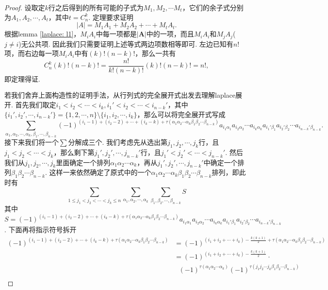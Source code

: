 \documentclass{article}
\newcommand{\mbf}[1]{\bm{#1}}
\begin{document}
\begin{proof}
设取定$k$行之后得到的所有可能的子式为$M_1,M_2,\cdots M_t$，它们的余子式分别为$A_1,A_2,\cdots,A_t$，其中$t=C_n^k$. 定理要求证明
$$
|A| = M_1A_1 + M_2A_2 + \cdots + M_tA_t.
$$
根据lemma \ref{laplace: l1}，$M_iA_i$中每一项都是$|\mbf{A}|$中的一项，而且$M_iA_i$和$M_jA_j$($j \neq i$)无公共项. {\color{blue}因此我们只需要证明上述等式两边项数相等即可}. 左边已知有$n!$项，而右边每一项$M_iA_i$中有$(k)!(n-k)!$，那么一共有
$$
C_n^k (k)!(n-k)! = \frac{n!}{k!(n-k)!}(k)!(n-k)! = n!,
$$
即定理得证.

\newpage
{\color{blue}若我们舍弃上面构造性的证明手法，从行列式的完全展开式出发去理解laplace展开}. 首先我们取定$i_1 < i_2 < \cdots < i_k, i_1' < i_2 < \cdots < i_{n-k}'$，其中$\{i_1',i_2',\cdots, i_{n-k}'\} = \{1,2,\cdots,n\}\setminus\{i_1,i_2,\cdots,i_k\}$，那么可以将完全展开式写成
$$
\sum\limits_{\alpha_1,\alpha_2,\cdots,\alpha_k,\beta_1,\cdots,\beta_{n-k}}(-1)^{(i_1-1)+(i_2-2) +\cdots + (i_k-k) + \tau(\alpha_1\alpha_2\cdots\alpha_k\beta_1\beta_2\cdots \beta_{n-k})} a_{i_1\alpha_1}a_{i_2\alpha_2}\cdots a_{i_k\alpha_k}a_{i_1'\beta_1}a_{i_2'\beta_2}\cdots a_{i_{n-k}'\beta_{n-k}}.
$$
接下来我们将一个$\sum$分解成三个. 我们考虑先从选出第$j_1,j_2,\cdots,j_k$行，且$j_1 < j_2 < \cdots < j_k$，那么剩下第$j_1',j_2',\cdots,j_{n-k}'$行，且$j_1' < j_2' < \cdots < j_{n-k}'$. 然后我们从$j_1,j_2,\cdots,j_k$里面确定一个排列$\alpha_1\alpha_2\cdots\alpha_k$，再从$j_1',j_2',\cdots,j_{n-k}'$中确定一个排列$\beta_1\beta_2\cdots \beta_{n-k}$. 这样一来依然确定了原式中的一个$\alpha_1\alpha_2\cdots\alpha_k\beta_1\beta_2\cdots\beta_{n-k}$排列，即此时有
$$
\sum\limits_{1\leq j_1 < j_2 < \cdots < j_k \leq n} \sum\limits_{\alpha_1,\alpha_2,\cdots,\alpha_k} \sum\limits_{\beta_1,\beta_2,\cdots,\beta_{n-k}} S
$$
其中$S = (-1)^{(i_1-1)+(i_2-2) +\cdots + (i_k-k) + \tau(\alpha_1\alpha_2\cdots\alpha_k\beta_1\beta_2\cdots \beta_{n-k})} a_{i_1\alpha_1}a_{i_2\alpha_2}\cdots a_{i_k\alpha_k}a_{i_1'\beta_1}a_{i_2'\beta_2}\cdots a_{i_{n-k}'\beta_{n-k}}$. 下面再将指示符号拆开
$$
\begin{array}{ll}
(-1)^{(i_1-1)+(i_2-2) +\cdots + (i_k-k) + \tau(\alpha_1\alpha_2\cdots\alpha_k\beta_1\beta_2\cdots \beta_{n-k})} &= (-1)^{(i_1 + i_2 + \cdots + i_k) - \frac{k(k+1)}{2} + \tau(\alpha_1\alpha_2\cdots\alpha_k\beta_1\beta_2\cdots \beta_{n-k})} \\
&= (-1)^{(i_1 + i_2 + \cdots + i_k) - \frac{k(k+1)}{2}} \cdot \\
&~~~(-1)^{\tau(\alpha_1\alpha_2\cdots\alpha_k)}(-1)^{\tau(j_1j_2\cdots j_k\beta_1\beta_2\cdots\beta_{n-k})} \\

\end{array}$$
\end{proof}
\end{document}

